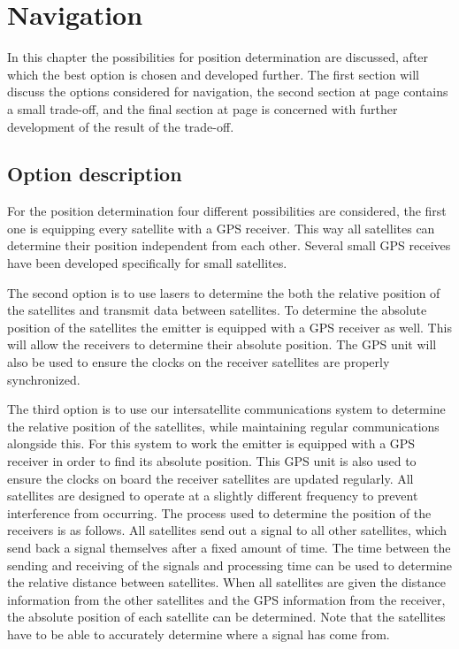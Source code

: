\documentclass[11pt]{report}
\begin{document}
\chapter{Navigation}
\label{NaviReceiver}
In this chapter the possibilities for position determination are discussed, after which the best option is chosen and developed further. The first section will discuss the options considered for navigation, the second section at page \pageref{navi2} contains a small trade-off, and the final section at page \pageref{navi3} is concerned with further development of the result of the trade-off.

\section{Option description}
\label{navi1}
For the position determination four different possibilities are considered, the first one is equipping every satellite with a \acs{GPS} receiver. This way all satellites can determine their position independent from each other. Several small \acs{GPS} receives have been developed specifically for small satellites.

The second option is to use lasers to determine the both the relative position of the satellites and transmit data between satellites. To determine the absolute position of the satellites the emitter is equipped with a \acs{GPS} receiver as well. This will allow the receivers to determine their absolute position. The \acs{GPS} unit will also be used to ensure the clocks on the receiver satellites are properly synchronized.

The third option is to use our intersatellite communications system to determine the relative position of the satellites, while maintaining regular communications alongside this. For this system to work the emitter is equipped with a GPS receiver in order to find its absolute position. This GPS unit is also used to ensure the clocks on board the receiver satellites are updated regularly. All satellites are designed to operate at a slightly different frequency to prevent interference from occurring. 
The process used to determine the position of the receivers is as follows. All satellites send out a signal to all other satellites, which send back a signal themselves after a fixed amount of time. The time between the sending and receiving of the signals and processing time can be used to determine the relative distance between satellites. When all satellites are given the distance information from the other satellites and the GPS information from the receiver, the absolute position of each satellite can be determined. Note that the satellites have to be able to accurately determine where a signal has come from.
\end{document}
